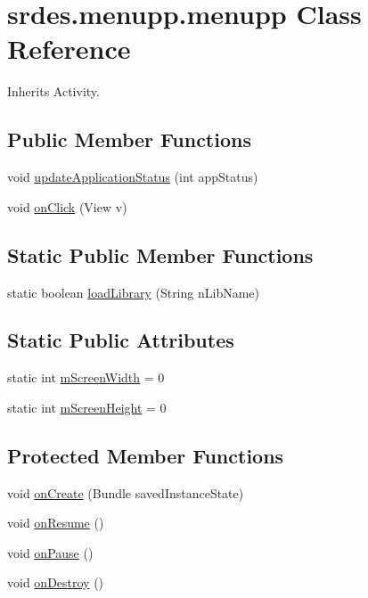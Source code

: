 \hypertarget{classsrdes_1_1menupp_1_1menupp}{\section{srdes.\-menupp.\-menupp \-Class \-Reference}
\label{classsrdes_1_1menupp_1_1menupp}
}


\-Inherits \-Activity.

\subsection*{\-Public \-Member \-Functions}
\begin{DoxyCompactItemize}
\item 
void \hyperlink{classsrdes_1_1menupp_1_1menupp_af6ab575dfa70ea18651168fcebb283c9}{update\-Application\-Status} (int app\-Status)
\item 
void \hyperlink{classsrdes_1_1menupp_1_1menupp_ae0075f05bed0749b0e9e2bc6399b1a08}{on\-Click} (\-View v)
\end{DoxyCompactItemize}
\subsection*{\-Static \-Public \-Member \-Functions}
\begin{DoxyCompactItemize}
\item 
static boolean \hyperlink{classsrdes_1_1menupp_1_1menupp_a7d1cfcfdd5c3f9c863df1faa9b3f1738}{load\-Library} (\-String n\-Lib\-Name)
\end{DoxyCompactItemize}
\subsection*{\-Static \-Public \-Attributes}
\begin{DoxyCompactItemize}
\item 
static int \hyperlink{classsrdes_1_1menupp_1_1menupp_a4c707a3dca1e4370e6fbc1e438ac977e}{m\-Screen\-Width} = 0
\item 
static int \hyperlink{classsrdes_1_1menupp_1_1menupp_ae888fb1e11aae271b03df1f0b6cd1f7c}{m\-Screen\-Height} = 0
\end{DoxyCompactItemize}
\subsection*{\-Protected \-Member \-Functions}
\begin{DoxyCompactItemize}
\item 
void \hyperlink{classsrdes_1_1menupp_1_1menupp_a1494a8422990bf625480f117baaf36f5}{on\-Create} (\-Bundle saved\-Instance\-State)
\item 
void \hyperlink{classsrdes_1_1menupp_1_1menupp_ae727bb828e86cd0bc27fb9ab702c9c17}{on\-Resume} ()
\item 
void \hyperlink{classsrdes_1_1menupp_1_1menupp_aef2ed12b51f76b8391b7ab6378921003}{on\-Pause} ()
\item 
void \hyperlink{classsrdes_1_1menupp_1_1menupp_a987c20463fa4459b46a7a01c7780599d}{on\-Destroy} ()
\end{DoxyCompactItemize}
